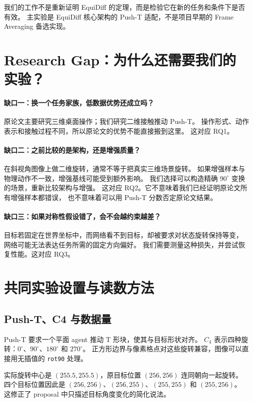我们的工作不是重新证明 EquiDiff 的定理，而是检验它在新的任务和条件下是否有效。
主实验是 EquiDiff 核心架构的 Push-T 适配，不是项目早期的 Frame Averaging 备选实现。

\section{Research Gap：为什么还需要我们的实验？}
\label{eqstudy:zh:gap}
\paragraph{缺口一：换一个任务家族，低数据优势还成立吗？}
原论文主要研究三维桌面操作；我们研究二维接触推动 Push-T。
操作形式、动作表示和接触过程不同，所以原论文的优势不能直接搬到这里。
这对应 RQ1。

\paragraph{缺口二：之前比较的是架构，还是增强质量？}
在斜视角图像上做二维旋转，通常不等于把真实三维场景旋转。
如果增强样本与物理动作不一致，增强基线可能受到额外影响。
我们选择可以构造精确 $90^\circ$ 变换的场景，重新比较架构与增强。
这对应 RQ2。它不意味着我们已经证明原论文所有增强样本都错误，
也不意味着可以用 Push-T 分数否定原论文结果。

\paragraph{缺口三：如果对称性假设错了，会不会越约束越差？}
目标若固定在世界坐标中，而网络看不到目标，却被要求对状态旋转保持等变，
网络可能无法表达任务所需的固定方向偏好。
我们需要测量这种损失，并尝试恢复性能。这对应 RQ3。

\section{共同实验设置与读数方法}
\label{eqstudy:zh:protocol}
\subsection{Push-T、C4 与数据量}
Push-T 要求一个平面 agent 推动 T 形块，使其与目标形状对齐。
$C_4$ 表示四种旋转：$0^\circ$、$90^\circ$、$180^\circ$ 和 $270^\circ$。
正方形边界与像素格点对这些旋转兼容，图像可以直接用无插值的
\texttt{rot90} 处理。

实际旋转中心是 $(255.5,255.5)$，原目标位置 $(256,256)$ 连同朝向一起旋转。
四个目标位置因此是 $(256,256)$、$(256,255)$、$(255,255)$ 和 $(255,256)$。
这修正了 proposal 中只描述目标角度变化的简化说法。

